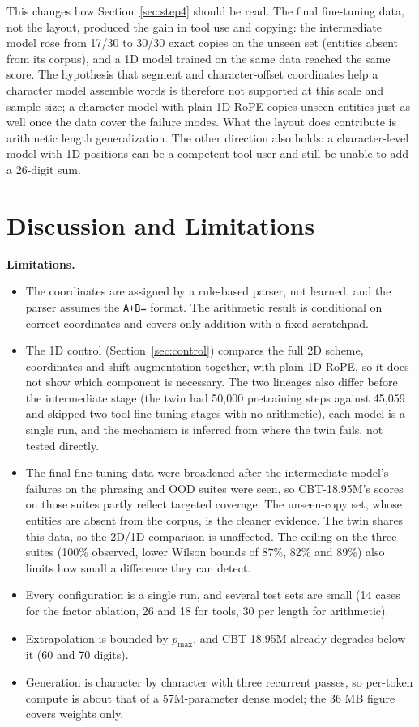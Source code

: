 \documentclass[10pt,twocolumn]{article}
\begin{document}
This changes how Section~\ref{sec:step4} should be read. The final fine-tuning data, not the layout, produced the gain in tool use and copying: the intermediate model rose from 17/30 to 30/30 exact copies on the unseen set (entities absent from its corpus), and a 1D model trained on the same data reached the same score. The hypothesis that segment and character-offset coordinates help a character model assemble words is therefore not supported at this scale and sample size; a character model with plain 1D-RoPE copies unseen entities just as well once the data cover the failure modes. What the layout does contribute is arithmetic length generalization. The other direction also holds: a character-level model with 1D positions can be a competent tool user and still be unable to add a 26-digit sum.

\section{Discussion and Limitations}\label{sec:discussion}

\textbf{Limitations.}
\begin{itemize}
\item The coordinates are assigned by a rule-based parser, not learned, and the parser assumes the \texttt{A+B=} format. The arithmetic result is conditional on correct coordinates and covers only addition with a fixed scratchpad.
\item The 1D control (Section~\ref{sec:control}) compares the full 2D scheme, coordinates and shift augmentation together, with plain 1D-RoPE, so it does not show which component is necessary. The two lineages also differ before the intermediate stage (the twin had 50,000 pretraining steps against 45,059 and skipped two tool fine-tuning stages with no arithmetic), each model is a single run, and the mechanism is inferred from where the twin fails, not tested directly.
\item The final fine-tuning data were broadened after the intermediate model's failures on the phrasing and OOD suites were seen, so CBT-18.95M's scores on those suites partly reflect targeted coverage. The unseen-copy set, whose entities are absent from the corpus, is the cleaner evidence. The twin shares this data, so the 2D/1D comparison is unaffected. The ceiling on the three suites (100\% observed, lower Wilson bounds of 87\%, 82\% and 89\%) also limits how small a difference they can detect.
\item Every configuration is a single run, and several test sets are small (14 cases for the factor ablation, 26 and 18 for tools, 30 per length for arithmetic).
\item Extrapolation is bounded by $p_{\max}$, and CBT-18.95M already degrades below it (60 and 70 digits).
\item Generation is character by character with three recurrent passes, so per-token compute is about that of a 57M-parameter dense model; the 36 MB figure covers weights only.
\end{itemize}
\end{document}
